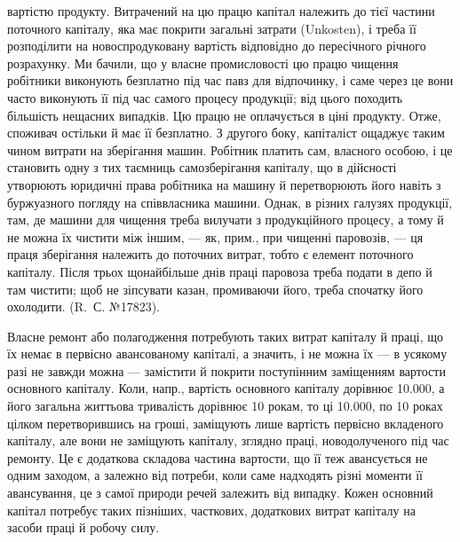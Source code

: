 \parcont{}  %
вартістю продукту. Витрачений на цю працю капітал належить до тієї частини поточного капіталу, яка
має покрити загальні затрати (Unkosten), і треба її розподілити на новоспродуковану вартість
відповідно до пересічного річного розрахунку. Ми бачили, що у власне промисловості цю працю чищення
робітники виконують безплатно під час павз для відпочинку, і саме через це вони часто виконують її
під час самого процесу продукції; від цього походить більшість нещасних випадків. Цю працю
не оплачується в ціні продукту. Отже, споживач остільки й має її безплатно. З другого боку,
капіталіст ощаджує таким чином витрати на зберігання машин. Робітник платить сам, власного особою, і
це становить одну з тих таємниць самозберігання капіталу, що в дійсності утворюють юридичні права
робітника на машину й перетворюють його навіть з буржуазного погляду на співвласника машини. Однак,
в різних галузях продукції, там, де машини для чищення треба вилучати з продукційного процесу, а
тому й не можна їх чистити між іншим, — як, прим., при чищенні паровозів, — ця праця зберігання
належить до поточних витрат, тобто є елемент поточного капіталу. Після трьох щонайбільше днів праці
паровоза треба подати в депо й там чистити; щоб не зіпсувати казан, промиваючи його, треба спочатку
його охолодити. (R.~С. №\num{17823}).

Власне ремонт або полагодження потребують таких витрат капіталу й праці, що їх немає в первісно
авансованому капіталі, а значить, і не можна їх — в усякому разі не завжди можна — замістити й
покрити поступінним заміщенням вартости основного капіталу. Коли, напр., вартість основного капіталу
дорівнює \num{10.000}, а його загальна життьова тривалість дорівнює 10 рокам, то ці \num{10.000}, по 10 роках цілком перетворившись на гроші, заміщують лише вартість первісно вкладеного
капіталу, але вони не заміщують капіталу, зглядно праці, новодолученого під час ремонту. Це є
додаткова складова частина вартости, що її теж авансується не одним заходом, а залежно від потреби,
коли саме надходять різні моменти її авансування, це з самої природи речей залежить від випадку.
Кожен основний капітал потребує таких пізніших,
часткових, додаткових витрат капіталу на засоби праці й робочу силу.

